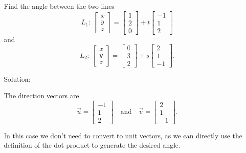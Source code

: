 \documentclass{ximera}
\begin{document}
\begin{example}\label{ex:angle-between-two-lines}

  Find the angle between the two lines%
  \begin{equation*}
    L_1:  \;
    \begin{bmatrix} x \\ y \\ z \end{bmatrix}
    = \begin{bmatrix} 1 \\ 2 \\ 0 \end{bmatrix}
    + t \begin{bmatrix} -1 \\ 1 \\ 2 \end{bmatrix}
  \end{equation*}
  and
  \begin{equation*}
    L_2: \;
    \begin{bmatrix} x \\ y \\ z \end{bmatrix}
    = \begin{bmatrix} 0 \\ 3 \\ 2 \end{bmatrix}
    + s \begin{bmatrix} 2 \\ 1 \\ -1 \end{bmatrix}.
  \end{equation*}

  Solution:

  The direction vectors are
  \begin{equation*}
    \vec{u}=\begin{bmatrix} -1 \\ 1 \\ 2 \end{bmatrix}
    \quad\mbox{and}\quad
    \vec{v}=\begin{bmatrix} 2 \\ 1 \\ -1 \end{bmatrix}.
  \end{equation*}

  In this case we don't need to convert to unit vectors, as we can directly use the definition of the dot product to generate the desired angle. 
  

\end{example}
\end{document}
